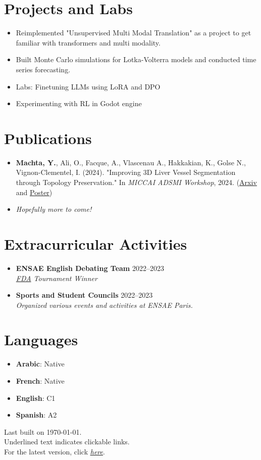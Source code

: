 \documentclass[letterpaper,11pt,twocolumn]{article}
\newcommand{\resumeItem}[1]{\item \small{#1}}
\newcommand{\resumeSubheading}[4]{
  \vspace{-2pt}\item \textbf{#1} \hfill #2 \\
  \textit{\small #3} \hfill \textit{\small #4} 
  \vspace{-7pt}
}
\begin{document}
\section{Projects and Labs}
\begin{itemize}[leftmargin=*]
  \resumeItem{Reimplemented "Unsupervised Multi Modal Translation" as a project to get familiar with transformers and multi modality.}
  \resumeItem{Built Monte Carlo simulations for Lotka-Volterra models and conducted time series forecasting.}
  \resumeItem{Labs: Finetuning LLMs using LoRA and DPO }
  \resumeItem{Experimenting with RL in Godot engine }
\end{itemize}

\section{Publications}
\begin{itemize}[leftmargin=*]
  \resumeItem{\textbf{Machta, Y.}, Ali, O., Facque, A., Vlascenau A., Hakkakian, K., Golse N., Vignon-Clementel, I. (2024). "Improving 3D Liver Vessel Segmentation through Topology Preservation." In \textit{MICCAI ADSMI Workshop}, 2024. (\href{https://arxiv.org/abs/2411.15778}{\underline{Arxiv}} and \href{https://MachtaYassine.github.io/Papers/2024_ADSMI_poster.pdf}{\underline{Poster}})}
  \resumeItem{\textit{Hopefully more to come!}}
\end{itemize}

\section{Extracurricular Activities}
\begin{itemize}[leftmargin=*]
  \resumeSubheading
    {ENSAE English Debating Team}{2022--2023}{\href{https://www.frenchdebatingassociation.fr/#fda}{FDA} Tournament Winner}{}
  \resumeSubheading
    {Sports and Student Councils}{2022--2023}{Organized various events and activities at ENSAE Paris.}{}
\end{itemize}

\section{Languages}
\begin{itemize}[leftmargin=*]
  \item \textbf{Arabic}: Native
  \item \textbf{French}: Native
  \item \textbf{English}: C1
  \item \textbf{Spanish}: A2
\end{itemize}

\begin{flushright}
  \vspace{-4pt}
  \color{gray}
  Last built on \today.  \\
  Underlined text indicates clickable links. \\
  For the latest version, click \href{https://machtayassine.github.io/resume/resume_ymachta.pdf}{\underline{\textit{here}}}.
\end{flushright}
\end{document}
